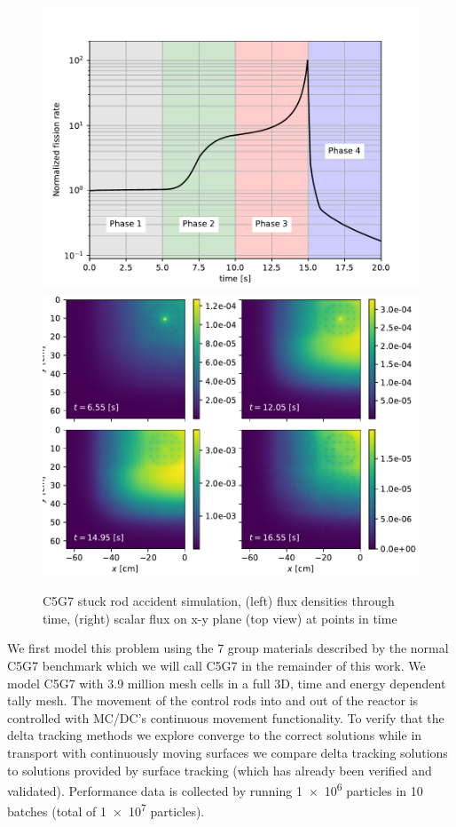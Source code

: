 \begin{figure}
    \centering
    \includegraphics[width=0.48\linewidth]{figures/delta_figs/c5/acc.pdf}
    \includegraphics[width=0.48\linewidth]{figures/delta_figs/c5/flux.pdf}
    \caption{C5G7 stuck rod accident simulation, (left) flux densities through time, (right) scalar flux on x-y plane (top view) at points in time}
    \label{fig:c5g7}
\end{figure}

We first model this problem using the 7 group materials described by the normal C5G7 benchmark \cite{jia_hou_oecdnea_2017} which we will call C5G7 in the remainder of this work.
We model C5G7 with \num{3.9} million mesh cells in a full 3D, time and energy dependent tally mesh.
The movement of the control rods into and out of the reactor is controlled with MC/DC's continuous movement functionality.
To verify that the delta tracking methods we explore converge to the correct solutions while in transport with continuously moving surfaces we compare delta tracking solutions to solutions provided by surface tracking (which has already been verified and validated).
Performance data is collected by running \num{1e6} particles in \num{10} batches (total of \num{1e7} particles).

